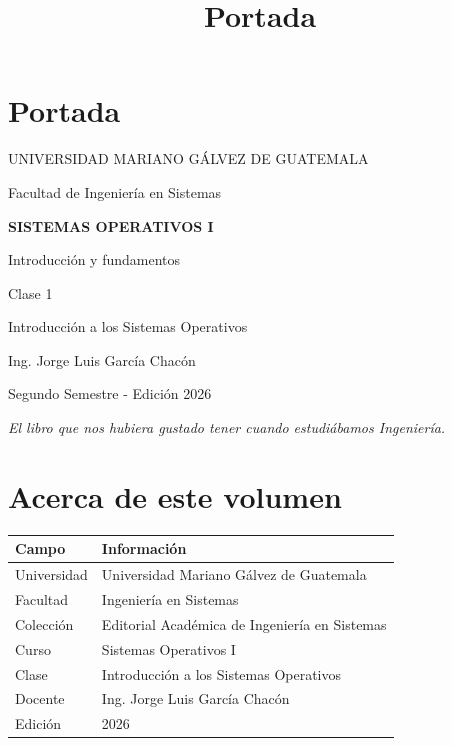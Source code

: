 \documentclass[
  spanish,
  letterpaper,
]{scrbook}
\title{Portada}
\author{}
\date{}
\newcounter{none} %
\renewcommand*\contentsname{Tabla de contenidos}
\newcommand\contentsname{Tabla de contenidos}
\begin{document}
\frontmatter
\maketitle

\renewcommand*\contentsname{Contenido}
{
\setcounter{tocdepth}{2}
\tableofcontents
}

\mainmatter
{}

\chapter{Portada}\label{portada}

\begin{titlepage}
\centering
\vspace*{1.5cm}
{\Large UNIVERSIDAD MARIANO GÁLVEZ DE GUATEMALA\par}
\vspace{0.4cm}
{\large Facultad de Ingeniería en Sistemas\par}
\vspace{1.5cm}
{\Huge\bfseries SISTEMAS OPERATIVOS I\par}
\vspace{0.5cm}
{\Large Introducción y fundamentos\par}
\vspace{1.2cm}
{\LARGE Clase 1\par}
\vspace{0.3cm}
{\Large Introducción a los Sistemas Operativos\par}
\vfill
{\Large Ing. Jorge Luis García Chacón\par}
\vspace{0.5cm}
{\large Segundo Semestre - Edición 2026\par}
\vspace{1.2cm}
{\itshape El libro que nos hubiera gustado tener cuando estudiábamos Ingeniería.\par}
\end{titlepage}
\clearpage


\chapter{Acerca de este volumen}\label{acerca-de-este-volumen}

{\def\LTcaptype{none} %
\begin{longtable}[]{@{}ll@{}}
\toprule\noalign{}
Campo & Información \\
\midrule\noalign{}
\endhead
\bottomrule\noalign{}
\endlastfoot
Universidad & Universidad Mariano Gálvez de Guatemala \\
Facultad & Ingeniería en Sistemas \\
Colección & Editorial Académica de Ingeniería en Sistemas \\
Curso & Sistemas Operativos I \\
Clase & Introducción a los Sistemas Operativos \\
Docente & Ing. Jorge Luis García Chacón \\
Edición & 2026 \\
\end{longtable}
}
\end{document}
